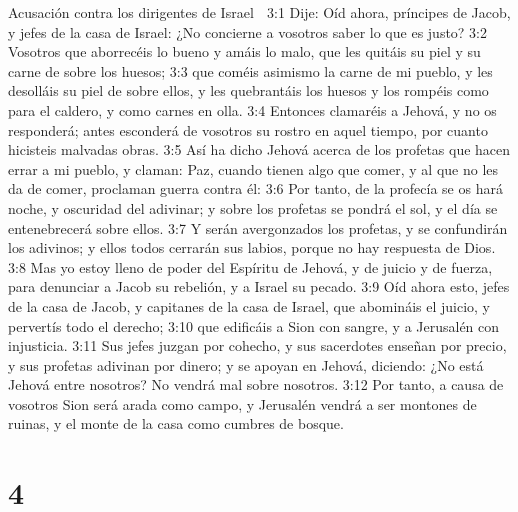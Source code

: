 Acusación contra los dirigentes de Israel  

3:1 Dije: Oíd ahora, príncipes de Jacob, y jefes de la casa de Israel: ¿No concierne a vosotros saber lo que es justo?  
3:2 Vosotros que aborrecéis lo bueno y amáis lo malo, que les quitáis su piel y su carne de sobre los huesos; 
3:3 que coméis asimismo la carne de mi pueblo, y les desolláis su piel de sobre ellos, y les quebrantáis los huesos y los rompéis como para el caldero, y como carnes en olla.  
3:4 Entonces clamaréis a Jehová, y no os responderá; antes esconderá de vosotros su rostro en aquel tiempo, por cuanto hicisteis malvadas obras.  
3:5 Así ha dicho Jehová acerca de los profetas que hacen errar a mi pueblo, y claman: Paz, cuando tienen algo que comer, y al que no les da de comer, proclaman guerra contra él:  
3:6 Por tanto, de la profecía se os hará noche, y oscuridad del adivinar; y sobre los profetas se pondrá el sol, y el día se entenebrecerá sobre ellos.  
3:7 Y serán avergonzados los profetas, y se confundirán los adivinos; y ellos todos cerrarán sus labios, porque no hay respuesta de Dios.  
3:8 Mas yo estoy lleno de poder del Espíritu de Jehová, y de juicio y de fuerza, para denunciar a Jacob su rebelión, y a Israel su pecado.  
3:9 Oíd ahora esto, jefes de la casa de Jacob, y capitanes de la casa de Israel, que abomináis el juicio, y pervertís todo el derecho;  
3:10 que edificáis a Sion con sangre, y a Jerusalén con injusticia.  
3:11 Sus jefes juzgan por cohecho, y sus sacerdotes enseñan por precio, y sus profetas adivinan por dinero; y se apoyan en Jehová, diciendo: ¿No está Jehová entre nosotros? No vendrá mal sobre nosotros.  
3:12 Por tanto, a causa de vosotros Sion será arada como campo, y Jerusalén vendrá a ser montones de ruinas, y el monte de la casa como cumbres de bosque. 

\chapter{4}

